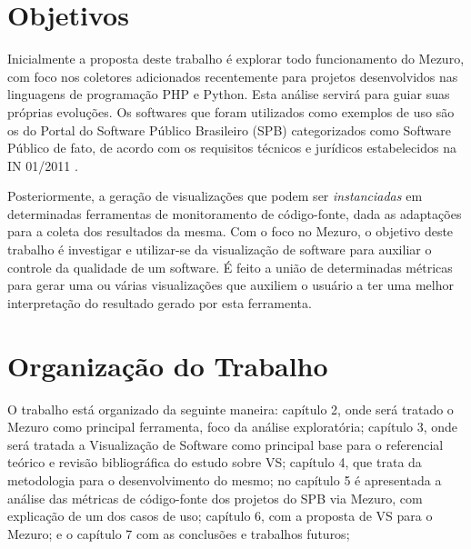 \section{Objetivos}

Inicialmente a proposta deste trabalho é explorar todo funcionamento do Mezuro,
com foco nos coletores adicionados recentemente para projetos desenvolvidos nas
linguagens de programação PHP e Python. Esta análise servirá para guiar suas próprias evoluções. Os softwares que foram utilizados como
exemplos de uso são os do Portal do Software Público Brasileiro (SPB)
categorizados como Software Público de fato, de acordo com os requisitos
técnicos e jurídicos estabelecidos na IN 01/2011 \cite{santos2011in01}.

Posteriormente, a geração de visualizações que podem
ser \textit{instanciadas} em determinadas ferramentas de monitoramento de
código-fonte, dada as adaptações para a coleta dos resultados da mesma. Com o
foco no Mezuro, o objetivo deste trabalho é investigar e utilizar-se da
visualização de software para auxiliar o controle da qualidade de um software.
É feito a união de determinadas métricas para gerar uma ou várias visualizações
que auxiliem o usuário a ter uma melhor interpretação do resultado gerado por
esta ferramenta.

\section{Organização do Trabalho}

O trabalho está organizado da seguinte maneira: capítulo 2, onde será tratado o
Mezuro como principal ferramenta, foco da análise exploratória; capítulo 3, onde
será tratada a Visualização de Software como principal base para o
referencial teórico e revisão bibliográfica do estudo sobre VS; capítulo 4,
que trata da metodologia para o desenvolvimento do mesmo; no capítulo 5 é
apresentada a análise das métricas de código-fonte dos projetos do SPB via
Mezuro, com explicação de um dos casos de uso; capítulo 6, com a proposta de VS
para o Mezuro; e o capítulo 7 com as conclusões e trabalhos futuros;
